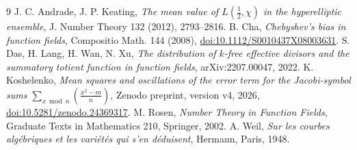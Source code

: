 \documentclass[11pt]{amsart}
\theoremstyle{remark}
\begin{document}
\begin{thebibliography}{9}
 J. C. Andrade, J. P. Keating, \emph{The mean value of $L(\tfrac12,\chi)$ in the hyperelliptic ensemble}, J. Number Theory 132 (2012), 2793--2816.
 B. Cha, \emph{Chebyshev's bias in function fields}, Compositio Math. 144 (2008), \href{https://doi.org/10.1112/S0010437X08003631}{doi:10.1112/S0010437X08003631}.
 S. Das, H. Lang, H. Wan, N. Xu, \emph{The distribution of $k$-free effective divisors and the summatory totient function in function fields}, arXiv:2207.00047, 2022.
 K. Koshelenko, \emph{Mean squares and oscillations of the error term for the Jacobi-symbol sums $\sum_{x\bmod n}(\frac{x^2-m}{n})$}, Zenodo preprint, version v4, 2026, \href{https://doi.org/10.5281/zenodo.24369317}{doi:10.5281/zenodo.24369317}.
 M. Rosen, \emph{Number Theory in Function Fields}, Graduate Texts in Mathematics 210, Springer, 2002.
 A. Weil, \emph{Sur les courbes alg\'ebriques et les vari\'et\'es qui s'en d\'eduisent}, Hermann, Paris, 1948.
\end{thebibliography}
\end{document}
